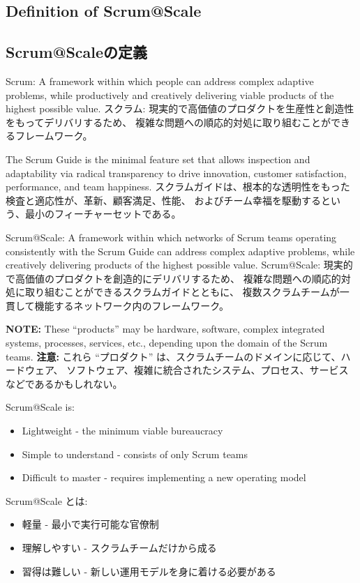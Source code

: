 \documentclass[12pt,a4paper,parskip=full]{scrartcl}
\begin{document}
\subsection{Definition of Scrum@Scale}
\fi
\subsection{Scrum@Scaleの定義}
Scrum: A framework within which people can address complex adaptive
problems, while productively and creatively delivering viable products of the
highest possible value.
\fi
スクラム: 現実的で高価値のプロダクトを生産性と創造性をもってデリバリするため、
複雑な問題への順応的対処に取り組むことができるフレームワーク。

The Scrum Guide is the minimal feature set that allows inspection and
adaptability via radical transparency to drive innovation, customer satisfaction, performance, and
team happiness.
\fi
スクラムガイドは、根本的な透明性をもった検査と適応性が、革新、顧客満足、性能、
およびチーム幸福を駆動するという、最小のフィーチャーセットである。

Scrum@Scale: A framework within which networks of Scrum teams operating
consistently with the Scrum Guide can address complex adaptive problems,
while creatively delivering products of the highest possible value.
\fi
Scrum@Scale: 現実的で高価値のプロダクトを創造的にデリバリするため、
複雑な問題への順応的対処に取り組むことができるスクラムガイドとともに、
複数スクラムチームが一貫して機能するネットワーク内のフレームワーク。

\textbf{NOTE:} These ``products'' may be hardware, software, complex
integrated systems, processes, services, etc., depending upon the domain of
the Scrum teams.
\fi
\textbf{注意:} これら ``プロダクト'' は、スクラムチームのドメインに応じて、ハードウェア、
ソフトウェア、複雑に統合されたシステム、プロセス、サービスなどであるかもしれない。

Scrum@Scale is:
\begin{itemize}
\item Lightweight - the minimum viable bureaucracy
\item Simple to understand - consists of only Scrum teams
\item Difficult to master - requires implementing a new operating model
\end{itemize}
\fi
Scrum@Scale とは:
\begin{itemize}
\item 軽量 - 最小で実行可能な官僚制
\item 理解しやすい - スクラムチームだけから成る
\item 習得は難しい - 新しい運用モデルを身に着ける必要がある
\end{itemize}
\end{document}
